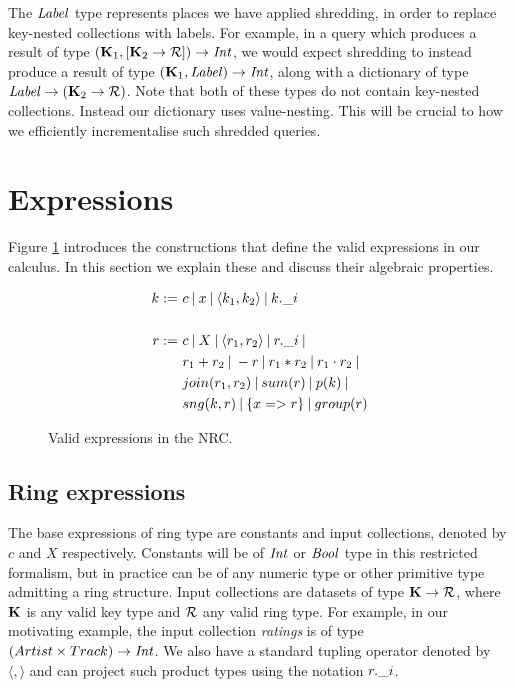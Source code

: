 {{{The $\textrm{\textit{Label}}$ type represents places we have applied shredding, in order to replace key-nested collections with labels. For example, in a query which produces a result of type  $(\mathbf{K}_1,[\mathbf{K}_2 \rightarrow \mathcal{R}]) \rightarrow \textrm{\textit{Int}}$, we would expect shredding to instead produce a result of type 
$(\mathbf{K}_1,\textrm{\textit{Label}}) \rightarrow \textrm{\textit{Int}}$, along with a dictionary of type $\textrm{\textit{Label}} \rightarrow (\mathbf{K}_2 \rightarrow \mathcal{R})$. Note that both of these types do not contain key-nested collections. Instead our dictionary uses value-nesting. This will be crucial to how we efficiently incrementalise such shredded queries.

}

\section{Expressions} \label{nrcexprsection}

Figure \ref{nrcexprs} introduces the constructions that define the valid expressions in our calculus. In this section we explain these and discuss their algebraic properties.

\begin{figure}
\begin{equation*}
\begin{split}
k := \ & c \: | \: x \: | \: \langle k_1, k_2 \rangle \: | \: k.\_i \\ \\
r := \ & c \: | \: X \: | \: \langle r_1, r_2 \rangle \: | \: r.\_i \: | \: \\
& r_1 + r_2 \: | \: -r \: | \: r_1 \ast r_2 \: | \: r_1 \cdot r_2 \: | \: \\
& join(r_1,r_2) \: | \: sum(r) \: | \: p(k) \: | \: \\
& sng(k,r) \: | \: \{ x => r \} \: | \: group(r)
\end{split}
\end{equation*}
\caption{Valid expressions in the NRC.}
\label{nrcexprs}
\end{figure}

\subsection{Ring expressions} {
The base expressions of ring type are constants and input collections, denoted by $c$ and $X$ respectively. Constants will be of $\textrm{\textit{Int}}$ or $\textrm{\textit{Bool}}$ type in this restricted formalism, but in practice can be of any numeric type or other primitive type admitting a ring structure. Input collections are datasets of type $\mathbf{K} \rightarrow \mathcal{R}$, where $\mathbf{K}$ is any valid key type and $\mathcal{R}$ any valid ring type. For example, in our motivating example, the input collection \textit{ratings} is of type $(Artist \times Track) \rightarrow \textrm{\textit{Int}}$. We also have a standard tupling operator denoted by $\langle , \rangle$ and can project such product types using the notation $r.\_i$.

}}}
